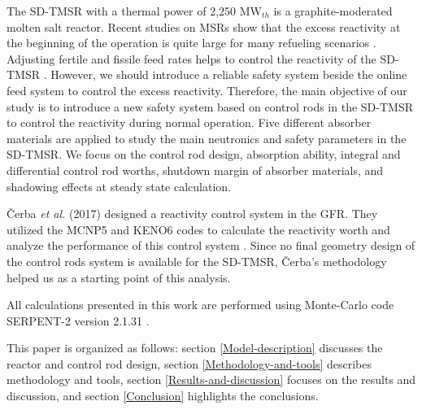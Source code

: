 The \gls{SD-TMSR} with a thermal power of 2,250 MW$_{th}$ \cite{ashraf2019whole_core,li_optimization_2018} is a graphite-moderated molten salt reactor. Recent studies on MSRs show that the excess reactivity at the beginning of the operation is quite large for many refueling scenarios \cite{ashraf2019whole_core,rykhlevskii2019modeling,betzler2016modeling,ashraf2018nuclear,ashraf2019modeling}. Adjusting fertile and fissile feed rates helps to control the reactivity of the SD-TMSR \cite{ashraf2019whole_core}. However, we should introduce a reliable safety system beside the online feed system to control the excess reactivity. Therefore, the main objective of our study is to introduce a new safety system based on control rods in the \gls{SD-TMSR} to control the reactivity during normal operation. Five different absorber materials are applied to study the main neutronics and safety parameters in the SD-TMSR. We focus on the control rod design, absorption ability, integral and differential control rod worths, shutdown margin of absorber materials, and shadowing effects at steady state calculation.

\v{C}erba \emph{et al.} (2017) designed a reactivity control system in the GFR. They utilized the MCNP5 \cite{briesmeister2000mcnptm} and KENO6 codes \cite{petrie1984keno} to calculate the reactivity worth and analyze the performance of this control system \cite{vcerba2017optimization}. Since no final geometry design of the control rods system is available for the SD-TMSR, \v{C}erba's methodology \cite{vcerba2017optimization}  helped us as a starting point of this analysis.

All calculations presented in this work are performed using Monte-Carlo code SERPENT-2 version 2.1.31 \cite{leppanen2014serpent}.

This paper is organized as follows: section \ref{Model-description} discusses the reactor and control rod design, section \ref{Methodology-and-tools} describes methodology and tools, section \ref{Results-and-discussion} focuses on the results and discussion, and section \ref{Conclusion} highlights the conclusions.